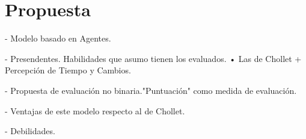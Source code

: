 \chapter{Propuesta}\label{chapter:proposal}

- Modelo basado en Agentes.

- Presendentes. Habilidades que asumo tienen los evaluados.
• Las de Chollet
+ Percepción de Tiempo y Cambios.

- Propuesta de evaluación no binaria."Puntuación" como medida de evaluación.

- Ventajas de este modelo respecto al de Chollet.

- Debilidades.